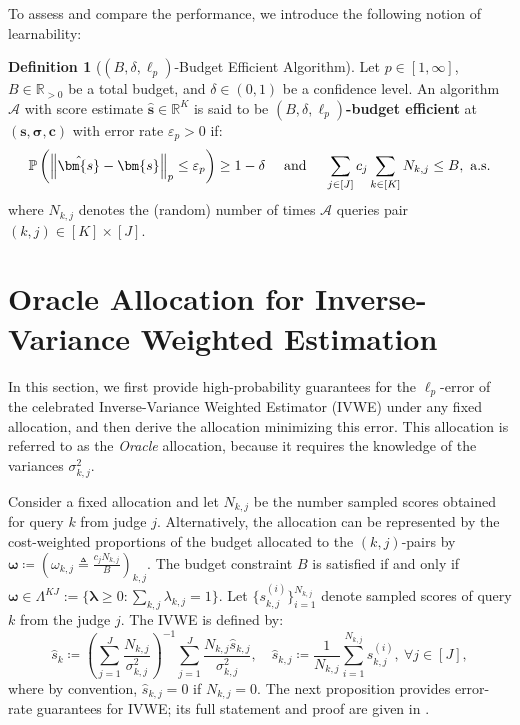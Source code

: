 \documentclass{article}
\def\vc{{\bm{c}}}
\def\vs{{\bm{s}}}
\def\gA{{\mathcal{A}}}
\def\sP{{\mathbb{P}}}
\def\sR{{\mathbb{R}}}
\theoremstyle{plain}
\theoremstyle{definition}
\newtheorem{definition}[theorem]{Definition}
\theoremstyle{plain}
\newcommand{\bignorm}[1]{\left\lVert #1 \right\rVert}
\newcommand{\ivwe}{\textsc{IVWE}}
\begin{document}
To assess and compare the performance, we introduce the following notion of learnability:
\begin{definition}[$(B, \delta, \ell_p)$-Budget Efficient Algorithm]
\label{def:budget-efficient}
    Let $p \in [1, \infty]$, $B \in \sR_{> 0}$ be a total budget, and $\delta \in (0, 1)$ be a confidence level.
    An algorithm $\gA$ with score estimate $\hat{\vs} \in \sR^K$ is said to be \textbf{$(B, \delta, \ell_p)$-budget efficient} at $(\vs, \bm\sigma, \vc)$ with error rate $\varepsilon_p > 0$ if:
$$
\sP\left( \bignorm{\hat{\vs} - \vs}_p \le \varepsilon_p \right) \ge 1 - \delta\quad \hbox{ and } \quad \sum_{j \in [J]} c_j \sum_{k \in [K]} N_{k,j} \le B, \hbox{ a.s.}
$$
where $N_{k,j}$ denotes the (random) number of times $\gA$ queries pair $(k, j) \in [K] \times [J]$.


    
        
\end{definition}

\section{Oracle Allocation for Inverse-Variance Weighted Estimation}
\label{sec:known}

In this section, we first provide high-probability guarantees for the $\ell_p$-error of the celebrated Inverse-Variance Weighted Estimator (IVWE) \citep{cochran1937problems, cochran1954combination} under any fixed allocation, and then derive the allocation minimizing this error. This allocation is referred to as the {\it Oracle} allocation, because it requires the knowledge of the variances $\sigma_{k,j}^2$.  

Consider a fixed allocation and let $N_{k,j}$ be the number sampled scores obtained for query $k$ from judge $j$. Alternatively, the allocation can be represented by the cost-weighted proportions of the budget allocated to the $(k,j)$-pairs by $\bm\omega \coloneq ( \omega_{k,j} \triangleq \frac{c_j N_{k,j}}{B})_{k,j}$. The budget constraint $B$ is satisfied if and only if $\bm\omega\in \Lambda^{KJ}:=\{\bm\lambda\ge 0: \sum_{k,j}\lambda_{k,j}=1\}$. Let $\{ s_{k,j}^{(i)} \}_{i=1}^{N_{k,j}}$ denote sampled scores of query $k$ from the judge $j$. The \ivwe{} is defined by: 
\begin{equation}
    \hat{s}_k \coloneq \left( \sum_{j=1}^J \frac{N_{k,j}}{\sigma_{k,j}^2} \right)^{-1} \sum_{j=1}^J \frac{N_{k,j} \hat{s}_{k,j}}{\sigma_{k,j}^2}, \quad
    \hat{s}_{k,j} \coloneq \frac{1}{N_{k,j}} \sum_{i=1}^{N_{k,j}} {s}_{k,j}^{(i)}, \ \forall j \in [J],
\end{equation}
where by convention, $\hat{s}_{k,j} = 0$ if $N_{k,j} = 0$. The next proposition provides error-rate guarantees for \ivwe{}; its full statement and proof are given in .
\end{document}
